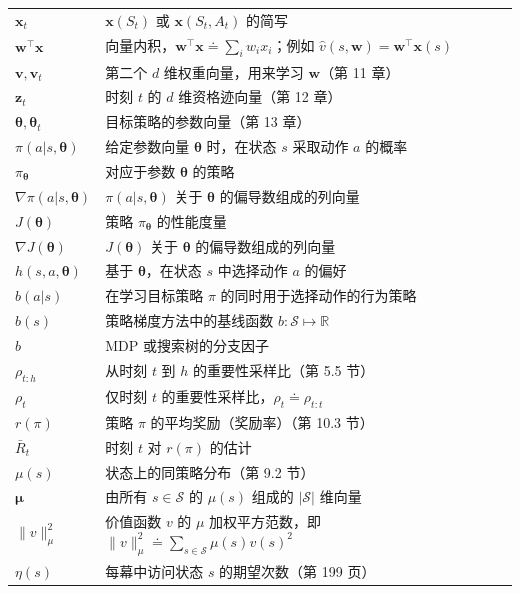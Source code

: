 \documentclass[UTF8, 12pt, fontset=fandol, oneside]{ctexart}
\begin{document}
\begin{longtable}{p{}p{}}
$\mathbf{x}_t$ & $\mathbf{x}(S_t)$ 或 $\mathbf{x}(S_t,A_t)$ 的简写 \\
$\mathbf{w}^\top\mathbf{x}$ & 向量内积，$\mathbf{w}^\top\mathbf{x}\doteq\sum_i w_i x_i$；例如 $\hat v(s,\mathbf{w})=\mathbf{w}^\top\mathbf{x}(s)$ \\
$\mathbf{v},\mathbf{v}_t$ & 第二个 $d$ 维权重向量，用来学习 $\mathbf{w}$（第 11 章） \\
$\mathbf{z}_t$ & 时刻 $t$ 的 $d$ 维资格迹向量（第 12 章） \\
$\boldsymbol{\theta},\boldsymbol{\theta}_t$ & 目标策略的参数向量（第 13 章） \\
$\pi(a|s,\boldsymbol{\theta})$ & 给定参数向量 $\boldsymbol{\theta}$ 时，在状态 $s$ 采取动作 $a$ 的概率 \\
$\pi_{\boldsymbol{\theta}}$ & 对应于参数 $\boldsymbol{\theta}$ 的策略 \\
$\nabla\pi(a|s,\boldsymbol{\theta})$ & $\pi(a|s,\boldsymbol{\theta})$ 关于 $\boldsymbol{\theta}$ 的偏导数组成的列向量 \\
$J(\boldsymbol{\theta})$ & 策略 $\pi_{\boldsymbol{\theta}}$ 的性能度量 \\
$\nabla J(\boldsymbol{\theta})$ & $J(\boldsymbol{\theta})$ 关于 $\boldsymbol{\theta}$ 的偏导数组成的列向量 \\
$h(s,a,\boldsymbol{\theta})$ & 基于 $\boldsymbol{\theta}$，在状态 $s$ 中选择动作 $a$ 的偏好 \\
$b(a|s)$ & 在学习目标策略 $\pi$ 的同时用于选择动作的行为策略 \\
$b(s)$ & 策略梯度方法中的基线函数 $b:\mathcal{S}\mapsto\mathbb{R}$ \\
$b$ & MDP 或搜索树的分支因子 \\
$\rho_{t:h}$ & 从时刻 $t$ 到 $h$ 的重要性采样比（第 5.5 节） \\
$\rho_t$ & 仅时刻 $t$ 的重要性采样比，$\rho_t\doteq\rho_{t:t}$ \\
$r(\pi)$ & 策略 $\pi$ 的平均奖励（奖励率）（第 10.3 节） \\
$\bar R_t$ & 时刻 $t$ 对 $r(\pi)$ 的估计 \\
$\mu(s)$ & 状态上的同策略分布（第 9.2 节） \\
$\boldsymbol{\mu}$ & 由所有 $s\in\mathcal{S}$ 的 $\mu(s)$ 组成的 $|\mathcal{S}|$ 维向量 \\
$\|v\|_\mu^2$ & 价值函数 $v$ 的 $\mu$ 加权平方范数，即 $\|v\|_\mu^2\doteq\sum_{s\in\mathcal{S}}\mu(s)v(s)^2$ \\
$\eta(s)$ & 每幕中访问状态 $s$ 的期望次数（第 199 页） \\

\end{longtable}
\end{document}
